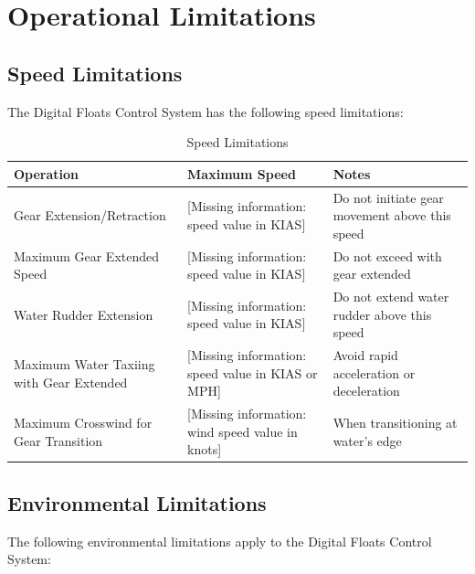 \documentclass[12pt,a4paper,twoside,openright]{book}
\newcommand{\tabletextfont}{\normalfont\rmfamily}
\newcommand{\tableheadfont}{\normalfont\bfseries}
\begin{document}
\section{Operational Limitations}

\subsection{Speed Limitations}

The Digital Floats Control System has the following speed limitations:

\begin{table}[h]
    \centering
\setlength{\tabcolsep}{5pt} %
\begin{tabular}{|p{}|p{}|p{}|}
\hline
\tableheadfont\textbf{Operation} & \tableheadfont\textbf{Maximum Speed} & \tableheadfont\textbf{Notes} \\
\hline
\tabletextfont Gear Extension/Retraction & {\color{red}[Missing information: speed value in KIAS]} & Do not initiate gear movement above this speed \\
\hline
\tabletextfont Maximum Gear Extended Speed & {\color{red}[Missing information: speed value in KIAS]} & Do not exceed with gear extended \\
\hline
\tabletextfont Water Rudder Extension & {\color{red}[Missing information: speed value in KIAS]} & Do not extend water rudder above this speed \\
\hline
\tabletextfont Maximum Water Taxiing with Gear Extended & {\color{red}[Missing information: speed value in KIAS or MPH]} & Avoid rapid acceleration or deceleration \\
\hline
\tabletextfont Maximum Crosswind for Gear Transition & {\color{red}[Missing information: wind speed value in knots]} & When transitioning at water's edge \\
\hline
\end{tabular}
\caption{Speed Limitations}
\end{table}

\subsection{Environmental Limitations}

The following environmental limitations apply to the Digital Floats Control System:
\end{document}
